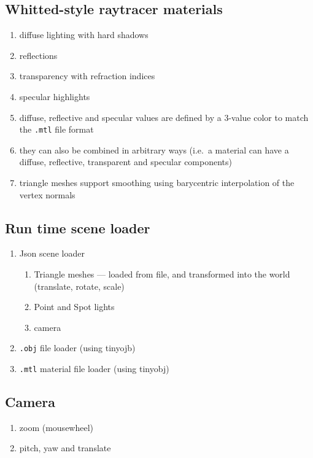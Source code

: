 \subsection{Whitted-style raytracer materials}
    \begin{enumerate}
    \item diffuse lighting with hard shadows
    \item reflections
    \item transparency with refraction indices
    \item specular highlights
    \item diffuse, reflective and specular values are defined by a 3-value color to match the \verb|.mtl| file format
    \item they can also be combined in arbitrary ways (i.e.\ a material can have a diffuse, reflective, transparent and specular components)
    \item triangle meshes support smoothing using barycentric interpolation of the vertex normals
    \end{enumerate}

\subsection{Run time scene loader}
    \begin{enumerate}
    \item Json scene loader
        \begin{enumerate}
        \item Triangle meshes --- loaded from file, and transformed into the world (translate, rotate, scale)
        \item Point and Spot lights
        \item camera
        \end{enumerate}
    \item \verb|.obj| file loader (using tinyojb)
    \item \verb|.mtl| material file loader (using tinyobj)
    \end{enumerate}

\subsection{Camera}
    \begin{enumerate}
    \item zoom (mousewheel)
    \item pitch, yaw and translate
    \end{enumerate}

